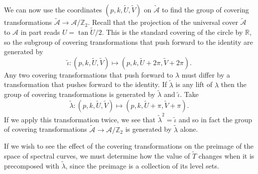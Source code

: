 \documentclass{article}
\numberwithin{equation}{section}
\numberwithin{figure}{section}
\newcommand{\labelthis}[1]{\addtocounter{equation}{1}\tag{\theequation}\label{#1}}
\newcommand{\R}{\mathbb{R}}
\begin{document}
We can now use the coordinates $(p,k,\tilde{U},\tilde{V})$ on $\mathcal{\tilde{A}}$ to find the group of covering transformations $\mathcal{\tilde{A}} \to \mathcal{A}/\mathbb{Z}_2$.
Recall that the projection of the universal cover $\mathcal{\tilde{A}}$ to $\mathcal{A}$ in part reads $U = \tan \tilde{U}/2$. This is the standard covering of the circle by $\R$, so the subgroup of covering transformations that push forward to the identity are generated by
\[
\tilde{\iota}: (p,k,\tilde{U},\tilde{V}) \mapsto (p,k,\tilde{U} + 2\pi ,\tilde{V} +2\pi). 
\]
Any two covering transformations that push forward to $\lambda$ must differ by a transformation that pushes forward to the identity. If $\tilde{\lambda}$ is any lift of $\lambda$ then the group of covering transformations is generated by $\tilde{\lambda}$ and $\tilde{\iota}$. Take
\[
\tilde{\lambda} : (p,k,\tilde{U},\tilde{V}) \mapsto (p,k, \tilde{U} + \pi, \tilde{V} + \pi).
\]
If we apply this transformation twice, we see that $\tilde{\lambda}^2 = \tilde{\iota}$ and so in fact the group of covering transformations $\mathcal{\tilde{A}} \to \mathcal{A}/\mathbb{Z}_2$ is generated by $\tilde{\lambda}$ alone.




If we wish to see the effect of the covering transformations on the preimage of the space of spectral curves, we must determine how the value of $\tilde{T}$ changes when it is precomposed with $\tilde{\lambda}$, since the preimage is a collection of its level sets.
\end{document}
